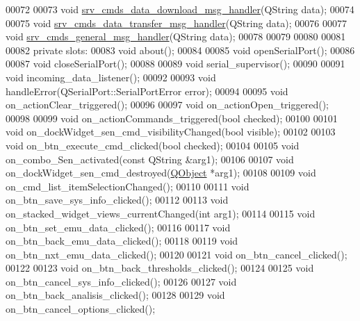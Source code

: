 \begin{DoxyCode}
00072 
00073     \textcolor{keywordtype}{void} \hyperlink{a00017_ac84167866950dd1eb9a29a5293546c1a}{srv\_cmds\_data\_download\_msg\_handler}(QString data);
00074 
00075     \textcolor{keywordtype}{void} \hyperlink{a00017_ae19ec21c1009c81700a8ad2e1f81be07}{srv\_cmds\_data\_transfer\_msg\_handler}(QString data);
00076 
00077     \textcolor{keywordtype}{void} \hyperlink{a00017_a8a8cd34488e8ee213350afb5b2261677}{srv\_cmds\_general\_msg\_handler}(QString data);
00078 
00079 
00080 
00081 
00082 \textcolor{keyword}{private} slots:
00083     \textcolor{keywordtype}{void} about();
00084 
00085     \textcolor{keywordtype}{void} openSerialPort();
00086 
00087     \textcolor{keywordtype}{void} closeSerialPort();
00088 
00089     \textcolor{keywordtype}{void} serial\_supervisor();
00090 
00091     \textcolor{keywordtype}{void} incoming\_data\_listener();
00092 
00093     \textcolor{keywordtype}{void} handleError(QSerialPort::SerialPortError error);
00094 
00095     \textcolor{keywordtype}{void} on\_actionClear\_triggered();
00096 
00097     \textcolor{keywordtype}{void} on\_actionOpen\_triggered();
00098 
00099     \textcolor{keywordtype}{void} on\_actionCommands\_triggered(\textcolor{keywordtype}{bool} checked);
00100 
00101     \textcolor{keywordtype}{void} on\_dockWidget\_sen\_cmd\_visibilityChanged(\textcolor{keywordtype}{bool} visible);
00102 
00103     \textcolor{keywordtype}{void} on\_btn\_execute\_cmd\_clicked(\textcolor{keywordtype}{bool} checked);
00104 
00105     \textcolor{keywordtype}{void} on\_combo\_Sen\_activated(\textcolor{keyword}{const} QString &arg1);
00106 
00107     \textcolor{keywordtype}{void} on\_dockWidget\_sen\_cmd\_destroyed(\hyperlink{a00059}{QObject} *arg1);
00108 
00109     \textcolor{keywordtype}{void} on\_cmd\_list\_itemSelectionChanged();
00110 
00111     \textcolor{keywordtype}{void} on\_btn\_save\_sys\_info\_clicked();
00112 
00113     \textcolor{keywordtype}{void} on\_stacked\_widget\_views\_currentChanged(\textcolor{keywordtype}{int} arg1);
00114 
00115     \textcolor{keywordtype}{void} on\_btn\_set\_emu\_data\_clicked();
00116 
00117     \textcolor{keywordtype}{void} on\_btn\_back\_emu\_data\_clicked();
00118 
00119     \textcolor{keywordtype}{void} on\_btn\_nxt\_emu\_data\_clicked();
00120 
00121     \textcolor{keywordtype}{void} on\_btn\_cancel\_clicked();
00122 
00123     \textcolor{keywordtype}{void} on\_btn\_back\_thresholds\_clicked();
00124 
00125     \textcolor{keywordtype}{void} on\_btn\_cancel\_sys\_info\_clicked();
00126 
00127     \textcolor{keywordtype}{void} on\_btn\_back\_analisis\_clicked();
00128 
00129     \textcolor{keywordtype}{void} on\_btn\_cancel\_options\_clicked();

\end{DoxyCode}
